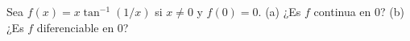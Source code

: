 \item Sea $f(x) = x \tan^{-1}(1/x)$ si $x \ne 0$ y $f(0) = 0$. (a) ¿Es $f$ continua en 0? (b) ¿Es $f$ diferenciable en 0?
